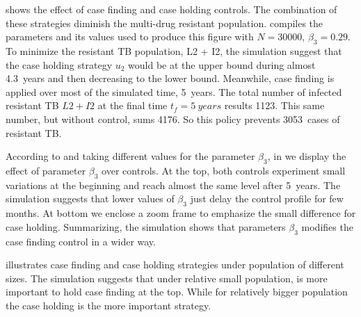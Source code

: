 %
	 shows the effect of case finding and 
case holding controls. The combination of these strategies diminish the multi-drug resistant population.  compiles the 
parameters and its values used to produce this figure with
$N = \num{30000}$, $\beta_3 = \num{0.29}$. To minimize the resistant TB 
population, L2 + I2, the simulation suggest that the case holding strategy 
$u_2$ would be at the upper bound during almost \SI{4.3}{years} and then 
decreasing to the lower bound. Meanwhile, case finding
is applied over most of the simulated time, \SI{5}{years}. The total number 
of 
infected resistant TB $L2 + I2$  at the final time $t_f = \SI{5}{years}$ results
\num{1123}. This same number, but without control, sums 4176. So this policy
prevents \SI{3053}{cases} of resistant TB.

  According to  and taking different values
for the parameter $\beta_3$, in  we display 
the effect of parameter $\beta_3$ over controls. 
At the top, both controls experiment small variations 
at the beginning and reach almost the same level after \SI{5}{years}. 
The simulation suggests that lower values of $\beta_3$ just delay the control
profile for few months. At bottom we enclose  a zoom frame to emphasize the 
small difference for
case holding. Summarizing, the simulation shows that parameters $\beta_3$  
modifies the case finding control in a wider way.

	 illustrates case finding and case holding 
strategies under population of different sizes. The simulation suggests that
under relative small population, is more important to hold case finding at the 
top. While for relatively bigger population the case holding is the more 
important strategy.

